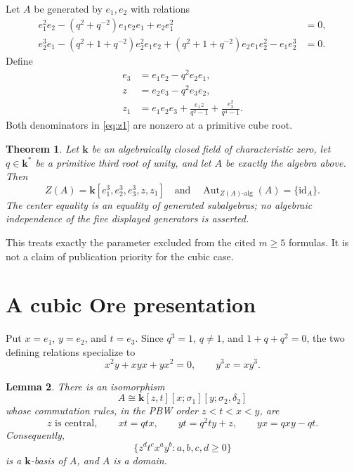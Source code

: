 \documentclass[11pt]{article}
\newtheorem{theorem}{Theorem}[section]
\newtheorem{lemma}[theorem]{Lemma}
\newcommand{\Aut}{\operatorname{Aut}}
\newcommand{\id}{\mathrm{id}}
\newcommand{\kk}{\mathbf{k}}
\begin{document}
Let $A$ be generated by $e_1,e_2$ with relations
\begin{align*}
 e_1^2e_2-(q^2+q^{-2})e_1e_2e_1+e_2e_1^2&=0,\\
 e_2^3e_1-(q^2+1+q^{-2})e_2^2e_1e_2
 +(q^2+1+q^{-2})e_2e_1e_2^2-e_1e_2^3&=0.
\end{align*}
Define
\begin{align}
 e_3&=e_1e_2-q^2e_2e_1,\label{eq:e3}\\
 z&=e_2e_3-q^2e_3e_2,\label{eq:z}\\
 z_1&=e_1e_2e_3+\frac{e_1z}{q^2-1}
                    +\frac{e_3^2}{q^4-1}.\label{eq:z1}
\end{align}
Both denominators in \eqref{eq:z1} are nonzero at a primitive cube root.

\begin{theorem}\label{thm:main}
Let $\kk$ be an algebraically closed field of characteristic zero, let
$q\in\kk^*$ be a primitive third root of unity, and let $A$ be exactly the
algebra above.  Then
\[
 Z(A)=\kk[e_1^3,e_2^3,e_3^3,z,z_1]
 \quad\text{and}\quad
 \Aut_{Z(A)\text{-alg}}(A)=\{\id_A\}.
\]
The center equality is an equality of generated subalgebras; no algebraic
independence of the five displayed generators is asserted.
\end{theorem}

This treats exactly the parameter excluded from the cited $m\geq5$ formulas.
It is not a claim of publication priority for the cubic case.

\section{A cubic Ore presentation}

Put $x=e_1$, $y=e_2$, and $t=e_3$.  Since
$q^3=1$, $q\neq1$, and $1+q+q^2=0$, the two defining relations specialize to
\begin{equation}
 x^2y+xyx+yx^2=0,
 \qquad
 y^3x=xy^3.
 \label{eq:specialized-serre}
\end{equation}

\begin{lemma}\label{lem:ore}
There is an isomorphism
\[
 A\cong \kk[z,t][x;\sigma_1][y;\sigma_2,\delta_2]
\]
whose commutation rules, in the PBW order $z<t<x<y$, are
\begin{equation}
 z\text{ is central},\qquad
 xt=qtx,\qquad
 yt=q^2ty+z,\qquad
 yx=qxy-qt.
 \label{eq:ore-rules}
\end{equation}
Consequently,
\[
 \{z^dt^cx^ay^b:a,b,c,d\geq0\}
\]
is a $\kk$-basis of $A$, and $A$ is a domain.
\end{lemma}
\end{document}
